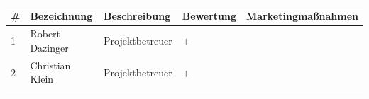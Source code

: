 \begin{longtable}[]{@{}lllll@{}}
\toprule
\begin{minipage}[b]{0.02\columnwidth}\raggedright
\#\strut
\end{minipage} & \begin{minipage}[b]{0.19\columnwidth}\raggedright
Bezeichnung\strut
\end{minipage} & \begin{minipage}[b]{0.20\columnwidth}\raggedright
Beschreibung\strut
\end{minipage} & \begin{minipage}[b]{0.15\columnwidth}\raggedright
Bewertung\strut
\end{minipage} & \begin{minipage}[b]{0.30\columnwidth}\raggedright
Marketingmaßnahmen\strut
\end{minipage}\tabularnewline
\midrule
\endhead
\begin{minipage}[t]{0.02\columnwidth}\raggedright
1\strut
\end{minipage} & \begin{minipage}[t]{0.19\columnwidth}\raggedright
Robert Dazinger\strut
\end{minipage} & \begin{minipage}[t]{0.20\columnwidth}\raggedright
Projektbetreuer\strut
\end{minipage} & \begin{minipage}[t]{0.15\columnwidth}\raggedright
+\strut
\end{minipage} & \begin{minipage}[t]{0.30\columnwidth}\raggedright
\strut
\end{minipage}\tabularnewline
\begin{minipage}[t]{0.02\columnwidth}\raggedright
2\strut
\end{minipage} & \begin{minipage}[t]{0.19\columnwidth}\raggedright
Christian Klein\strut
\end{minipage} & \begin{minipage}[t]{0.20\columnwidth}\raggedright
Projektbetreuer\strut
\end{minipage} & \begin{minipage}[t]{0.15\columnwidth}\raggedright
+\strut
\end{minipage} & \begin{minipage}[t]{0.30\columnwidth}\raggedright
\strut
\end{minipage}\tabularnewline
\begin{minipage}[t]{0.02\columnwidth}\raggedright

\end{minipage}
\end{longtable}

